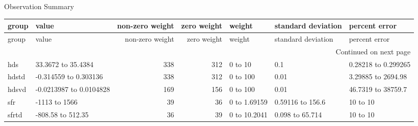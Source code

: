 \documentclass{article}
\begin{document}
\begin{center}
Observation Summary
\end{center}
\begin{center}
\begin{landscape}
\setlength{\LTleft}{-4.0cm}
\begin{longtable}{llrrlll}
\toprule
group &                   value &  non-zero weight &  zero weight &           weight & standard deviation &       percent error \\
\midrule
\endfirsthead

\toprule
group &                   value &  non-zero weight &  zero weight &           weight & standard deviation &       percent error \\
\midrule
\endhead
\midrule
\multicolumn{7}{r}{{Continued on next page}} \\
\midrule
\endfoot

\bottomrule
\endlastfoot
  hds &      33.3672 to 35.4384 &              338 &          312 &       0 to    10 &                0.1 & 0.28218 to 0.299265 \\
hdstd &   -0.314559 to 0.303136 &              338 &          312 &       0 to   100 &               0.01 &  3.29885 to 2694.98 \\
hdsvd & -0.0213987 to 0.0104828 &              169 &          156 &       0 to   100 &               0.01 &  46.7319 to 38759.7 \\
  sfr &          -1113 to  1566 &               39 &           36 &     0 to 1.69159 &   0.59116 to 156.6 &         10 to    10 \\
sfrtd &       -808.58 to 512.35 &               36 &           39 &     0 to 10.2041 &    0.098 to 65.714 &         10 to    10 \\
\end{longtable}
\end{landscape}
\end{center}
\end{document}
